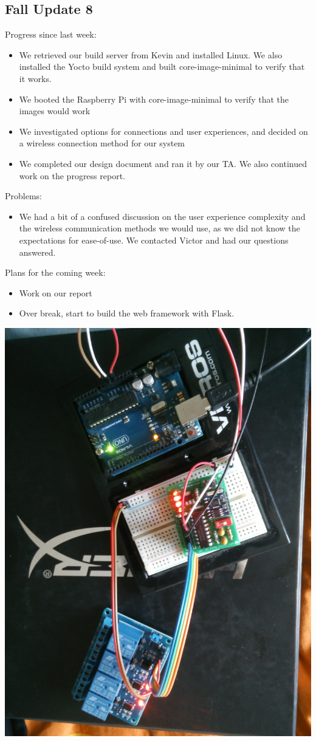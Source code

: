 \subsection{Fall Update 8}
Progress since last week:
\begin{itemize}
   \item We retrieved our build server from Kevin and installed Linux. We also installed the Yocto build system and built core-image-minimal to verify that it works.
   \item We booted the Raspberry Pi with core-image-minimal to verify that the images would work
   \item We investigated options for connections and user experiences, and decided on a wireless connection method for our system
   \item We completed our design document and ran it by our TA. We also continued work on the progress report.
\end{itemize}
Problems:
\begin{itemize}
   \item We had a bit of a confused discussion on the user experience complexity and the wireless communication methods we would use, as we did not know the expectations for ease-of-use. We contacted Victor and had our questions answered.
\end{itemize}
Plans for the coming week:
\begin{itemize}
   \item Work on our report
   \item Over break, start to build the web framework with Flask.
\end{itemize}
\includegraphics[scale=0.05]{circuit1}\\
